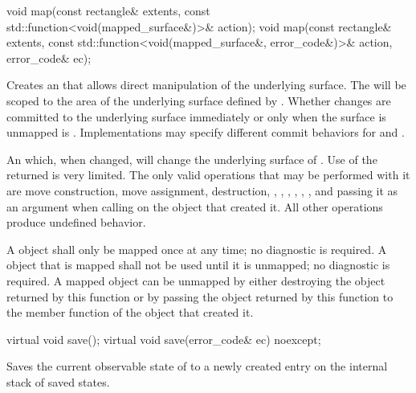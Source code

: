 \begin{itemdecl}
void map(const rectangle& extents,
  const std::function<void(mapped_surface&)>& action);
void map(const rectangle& extents,
  const std::function<void(mapped_surface&, error_code&)>& action,
  error_code& ec);
\end{itemdecl}
\begin{itemdescr}
	\pnum
	\effects
	Creates an  that allows direct manipulation of the underlying surface. The  will be scoped to the area of the underlying surface defined by . Whether changes are committed to the underlying surface immediately or only when the surface is unmapped is . Implementations may specify different commit behaviors for  and .
	
	\pnum
	\returns
	An  which, when changed, will change the underlying surface of . 
	\enternote
	Use of the returned  is very limited. The only valid operations that may be performed with it are move construction, move assignment, destruction, , , , , , , and passing it as an argument when calling  on the  object that created it. All other operations produce undefined behavior.
	\exitnote
	
	\pnum
	\remarks
	A  object shall only be mapped once at any time; no diagnostic is required. A  object that is mapped shall not be used until it is unmapped; no diagnostic is required. A mapped  object can be unmapped by either destroying the  object returned by this function or by passing the  object returned by this function to the  member function of the  object that created it. 
\end{itemdescr}

\begin{itemdecl}
virtual void save();
virtual void save(error_code& ec) noexcept;
\end{itemdecl}
\begin{itemdescr}
	\pnum
	\effects
	Saves the current observable state of  to a newly created entry on the internal stack of saved states.
\end{itemdescr}

